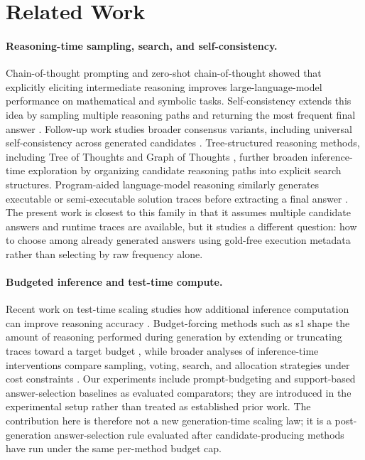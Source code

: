 \section{Related Work}
\label{sec:related_work}

\paragraph{Reasoning-time sampling, search, and self-consistency.}
Chain-of-thought prompting \citep{wei2022chain} and zero-shot chain-of-thought \citep{kojima2022large} showed that explicitly eliciting intermediate reasoning improves large-language-model performance on mathematical and symbolic tasks.
Self-consistency extends this idea by sampling multiple reasoning paths and returning the most frequent final answer \citep{wang2023selfconsistency}.
Follow-up work studies broader consensus variants, including universal self-consistency across generated candidates \citep{chen2023universalselfconsistency}.
Tree-structured reasoning methods, including Tree of Thoughts \citep{yao2023tree} and Graph of Thoughts \citep{besta2024graph}, further broaden inference-time exploration by organizing candidate reasoning paths into explicit search structures.
Program-aided language-model reasoning similarly generates executable or semi-executable solution traces before extracting a final answer \citep{gao2023pal}.
The present work is closest to this family in that it assumes multiple candidate answers and runtime traces are available, but it studies a different question: how to choose among already generated answers using gold-free execution metadata rather than selecting by raw frequency alone.

\paragraph{Budgeted inference and test-time compute.}
Recent work on test-time scaling studies how additional inference computation can improve reasoning accuracy \citep{snell2024scaling}.
Budget-forcing methods such as s1 shape the amount of reasoning performed during generation by extending or truncating traces toward a target budget \citep{muennighoff2025s1}, while broader analyses of inference-time interventions compare sampling, voting, search, and allocation strategies under cost constraints \citep{wu2024inference}.
Our experiments include prompt-budgeting and support-based answer-selection baselines as evaluated comparators; they are introduced in the experimental setup rather than treated as established prior work.
The contribution here is therefore not a new generation-time scaling law; it is a post-generation answer-selection rule evaluated after candidate-producing methods have run under the same per-method budget cap.

